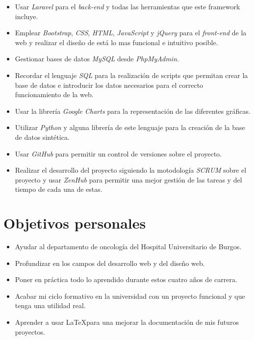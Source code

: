 \begin{itemize}
    \item Usar \textit{Laravel} para el \textit{back-end} y todas las herramientas que este framework incluye.
    \item Emplear \textit{Bootstrap}, \textit{CSS}, \textit{HTML}, \textit{JavaScript} y \textit{jQuery} para el \textit{front-end} de la web y realizar el diseño de está lo mas funcional e intuitivo posible.
    \item Gestionar bases de datos \textit{MySQL} desde \textit{PhpMyAdmin}.
    \item Recordar el lenguaje \textit{SQL} para la realización de scripts que permitan crear la base de datos e introducir los datos necesarios para el correcto funcionamiento de la web.
    \item Usar la librería \textit{Google Charts} para la representación de las diferentes gráficas.
    \item Utilizar \textit{Python} y alguna librería de este lenguaje para la creación de la base de datos sintética.
    \item Usar \textit{GitHub} para permitir un control de versiones sobre el proyecto.
    \item Realizar el desarrollo del proyecto siguiendo la motodología \textit{SCRUM} sobre el proyecto y usar \textit{ZenHub} para permitir una mejor gestión de las tareas y del tiempo de cada una de estas.
\end{itemize}
\section{Objetivos personales}
\begin{itemize}
    \item Ayudar al departamento de oncología del Hospital Universitario de Burgos.
    \item Profundizar en los campos del desarrollo web y del diseño web.
    \item Poner en práctica todo lo aprendido durante estos cuatro años de carrera.
    \item Acabar mi ciclo formativo en la universidad con un proyecto funcional y que tenga una utilidad real.
    \item Aprender a usar \LaTeX para una mejorar la documentación de mis futuros proyectos.
\end{itemize}